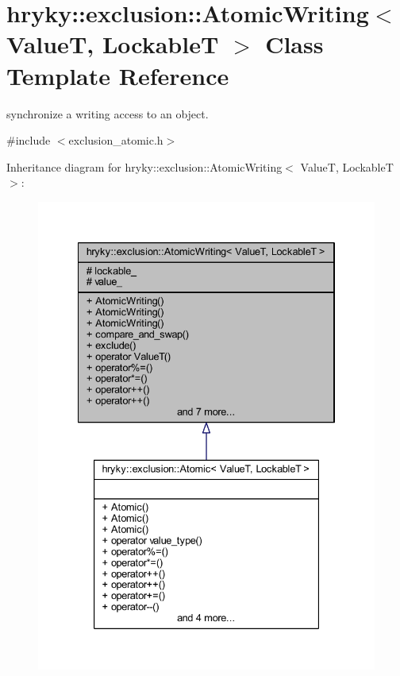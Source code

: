 \hypertarget{classhryky_1_1exclusion_1_1_atomic_writing}{\section{hryky\-:\-:exclusion\-:\-:Atomic\-Writing$<$ Value\-T, Lockable\-T $>$ Class Template Reference}
\label{classhryky_1_1exclusion_1_1_atomic_writing}
}


synchronize a writing access to an object.  




{\ttfamily \#include $<$exclusion\-\_\-atomic.\-h$>$}



Inheritance diagram for hryky\-:\-:exclusion\-:\-:Atomic\-Writing$<$ Value\-T, Lockable\-T $>$\-:\nopagebreak
\begin{figure}[H]
\begin{center}
\leavevmode
\includegraphics[width=334pt]{classhryky_1_1exclusion_1_1_atomic_writing__inherit__graph}
\end{center}
\end{figure}
